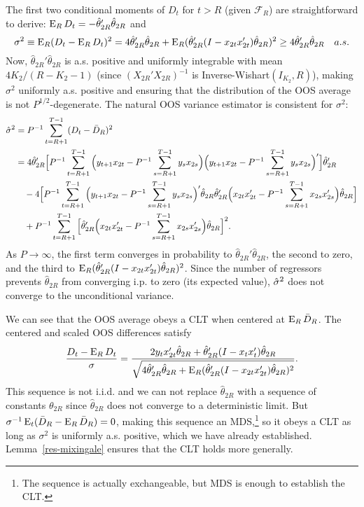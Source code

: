 \documentclass[11pt]{article}
\begin{document}
The first two conditional moments of $D_t$ for $t > R$ (given
$\mathcal{F}_R$) are straightforward to derive: $\operatorname{E}_R D_t = -
\hat{\theta}_{2R}' \hat{\theta}_{2R}$ and
\begin{equation*}
  \sigma^2 \equiv \operatorname{E}_R(D_t - \operatorname{E}_R D_t)^2 = 4
  \hat{\theta}_{2R}' \hat{\theta}_{2R} +
  \operatorname{E}_R(\hat{\theta}_{2R}' (I - x_{2t} x_{2t}')
  \hat{\theta}_{2R})^2   \geq 4 \hat{\theta}_{2R}'
  \hat{\theta}_{2R} \quad a.s.
\end{equation*}
Now, $\hat{\theta}_{2R}' \hat{\theta}_{2R}$ is
a.s. positive and uniformly integrable with mean $4 K_2 / (R - K_2 -
1)$ (since $(X_{2R}'X_{2R})^{-1}$ is Inverse-Wishart$(I_{K_2}, R)$),
making $\sigma^2$ uniformly a.s. positive and ensuring that the
distribution of the OOS average is not $P^{1/2}$-degenerate.  The
natural OOS variance estimator is consistent for $\sigma^2$:
\begin{align*}
  \hat{\sigma}^2 &= P^{-1} \sum_{t=R+1}^{T-1} (D_t - \bar{D}_{R})^2 \\
  &= 4 \hat{\theta}_{2R}' \Big[P^{-1} \sum_{t=R+1}^{T-1}
  \Big(y_{t+1} x_{2t} - P^{-1} \sum_{s=R+1}^{T-1} y_s x_{2s}\Big)
  \Big(y_{t+1} x_{2t} - P^{-1} \sum_{s=R+1}^{T-1} y_s
  x_{2s}\Big)'\Big] \hat{\theta}_{2R}' \\ & \quad - 4
  \Big[P^{-1} \sum_{t=R+1}^{T-1} \Big(y_{t+1} x_{2t} - P^{-1}
  \sum_{s=R+1}^{T-1} y_s x_{2s}\Big)' \hat{\theta}_{2R}
  \hat{\theta}_{2R}' \Big(x_{2t} x_{2t}' - P^{-1}
  \sum_{s=R+1}^{T-1} x_{2s} x_{2s}' \Big) \hat{\theta}_{2R} \Big]
  \\ &\quad + P^{-1} \sum_{t=R+1}^{T-1}
  \Big[\hat{\theta}_{2R}' \Big(x_{2t} x_{2t}' - P^{-1}
  \sum_{s=R+1}^{T-1} x_{2s} x_{2s}' \Big) \hat{\theta}_{2R}  \Big]^{2}.
\end{align*}
As $P \to \infty$, the first term converges in probability to
$\hat{\theta}_{2R}' \hat{\theta}_{2R}$, the second to zero,
and the third to $\operatorname{E}_R(\hat{\theta}_{2R}'(I - x_{2t}x_{2t}')
\hat{\theta}_{2R})^2$.  Since the number of regressors prevents
$\hat{\theta}_{2R}$ from converging i.p. to zero (its expected
value), $\hat{\sigma}^2$ does not converge to the unconditional
variance.

We can see that the OOS average obeys a CLT when centered at $\operatorname{E}_R
\bar{D}_R$.  The centered and scaled OOS differences satisfy
\begin{equation*}
  \frac{D_t - \operatorname{E}_R D_t}{\sigma} =
  \frac{2 y_{t} x_{2t}' \hat{\theta}_{2R} +
    \hat{\theta}_{2R}' (I - x_t x_t') \hat{\theta}_{2R}}{\sqrt{4
    \hat{\theta}_{2R}' \hat{\theta}_{2R} +
    \operatorname{E}_R(\hat{\theta}_{2R}'(I - x_{2t} x_{2t}') \hat{\theta}_{2R})^2}}.
\end{equation*}
This sequence is not i.i.d. and we can not replace $\hat{\theta}_{2R}$
with a sequence of constants $\theta_{2R}$ since $\hat{\theta}_{2R}$
does not converge to a deterministic limit.  But $\sigma^{-1}
\operatorname{E}_t(\bar{D}_{R} - \operatorname{E}_R\bar{D}_{R}) = 0$, making this sequence an
MDS,\footnote{The sequence is actually exchangeable, but MDS is
  enough to establish the CLT.} so it obeys a CLT as long as
$\sigma^2$ is uniformly a.s. positive, which we have already
established.  Lemma~\ref{res-mixingale} ensures that the CLT holds
more generally.
\end{document}
